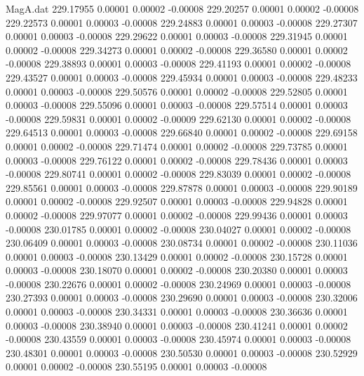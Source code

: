 \begin{filecontents}{MagA.dat}
 229.17955    0.00001    0.00002   -0.00008
 229.20257    0.00001    0.00002   -0.00008
 229.22573    0.00001    0.00003   -0.00008
 229.24883    0.00001    0.00003   -0.00008
 229.27307    0.00001    0.00003   -0.00008
 229.29622    0.00001    0.00003   -0.00008
 229.31945    0.00001    0.00002   -0.00008
 229.34273    0.00001    0.00002   -0.00008
 229.36580    0.00001    0.00002   -0.00008
 229.38893    0.00001    0.00003   -0.00008
 229.41193    0.00001    0.00002   -0.00008
 229.43527    0.00001    0.00003   -0.00008
 229.45934    0.00001    0.00003   -0.00008
 229.48233    0.00001    0.00003   -0.00008
 229.50576    0.00001    0.00002   -0.00008
 229.52805    0.00001    0.00003   -0.00008
 229.55096    0.00001    0.00003   -0.00008
 229.57514    0.00001    0.00003   -0.00008
 229.59831    0.00001    0.00002   -0.00009
 229.62130    0.00001    0.00002   -0.00008
 229.64513    0.00001    0.00003   -0.00008
 229.66840    0.00001    0.00002   -0.00008
 229.69158    0.00001    0.00002   -0.00008
 229.71474    0.00001    0.00002   -0.00008
 229.73785    0.00001    0.00003   -0.00008
 229.76122    0.00001    0.00002   -0.00008
 229.78436    0.00001    0.00003   -0.00008
 229.80741    0.00001    0.00002   -0.00008
 229.83039    0.00001    0.00002   -0.00008
 229.85561    0.00001    0.00003   -0.00008
 229.87878    0.00001    0.00003   -0.00008
 229.90189    0.00001    0.00002   -0.00008
 229.92507    0.00001    0.00003   -0.00008
 229.94828    0.00001    0.00002   -0.00008
 229.97077    0.00001    0.00002   -0.00008
 229.99436    0.00001    0.00003   -0.00008
 230.01785    0.00001    0.00002   -0.00008
 230.04027    0.00001    0.00002   -0.00008
 230.06409    0.00001    0.00003   -0.00008
 230.08734    0.00001    0.00002   -0.00008
 230.11036    0.00001    0.00003   -0.00008
 230.13429    0.00001    0.00002   -0.00008
 230.15728    0.00001    0.00003   -0.00008
 230.18070    0.00001    0.00002   -0.00008
 230.20380    0.00001    0.00003   -0.00008
 230.22676    0.00001    0.00002   -0.00008
 230.24969    0.00001    0.00003   -0.00008
 230.27393    0.00001    0.00003   -0.00008
 230.29690    0.00001    0.00003   -0.00008
 230.32006    0.00001    0.00003   -0.00008
 230.34331    0.00001    0.00003   -0.00008
 230.36636    0.00001    0.00003   -0.00008
 230.38940    0.00001    0.00003   -0.00008
 230.41241    0.00001    0.00002   -0.00008
 230.43559    0.00001    0.00003   -0.00008
 230.45974    0.00001    0.00003   -0.00008
 230.48301    0.00001    0.00003   -0.00008
 230.50530    0.00001    0.00003   -0.00008
 230.52929    0.00001    0.00002   -0.00008
 230.55195    0.00001    0.00003   -0.00008

\end{filecontents}
